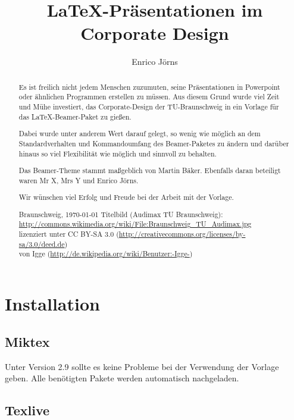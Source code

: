 \documentclass[cmyk,a4paper,colorscheme=green,TUBStitlepage=picture]{tubsreprt}
\author{Enrico Jörns}
\title{LaTeX-Präsentationen im Corporate Design}
\institute{TU-Braunschweig}
\begin{document}
\maketitle

\begin{abstract}
Es ist freilich nicht jedem Menschen zuzumuten, seine Präsentationen in
Powerpoint oder ähnlichen Programmen erstellen zu müssen.
Aus diesem Grund wurde viel Zeit und Mühe investiert, das Corporate-Design der
TU-Braunschweig in ein Vorlage für das \LaTeX-Beamer-Paket zu gießen.\medskip

Dabei wurde unter anderem Wert darauf gelegt, so wenig wie möglich an dem
Standardverhalten und Kommandoumfang des Beamer-Paketes zu ändern und darüber
hinaus so viel Flexibilität wie möglich und sinnvoll zu behalten.\medskip

Das Beamer-Theme stammt maßgeblich von Martin Bäker. Ebenfalls daran beteiligt
waren Mr X, Mrs Y und Enrico Jörns.%
\bigskip

Wir wünschen viel Erfolg und Freude bei der Arbeit mit der Vorlage.
\bigskip

{\hfill Braunschweig, \today}
\vfill
\footnotesize{Titelbild (Audimax TU Braunschweig):\\
\url{http://commons.wikimedia.org/wiki/File:Braunschweig_TU_Audimax.jpg}\\
lizenziert unter CC BY-SA 3.0 (\url{http://creativecommons.org/licenses/by-sa/3.0/deed.de})\\
von Igge (\url{http://de.wikipedia.org/wiki/Benutzer:-Igge-})}
\end{abstract}

\clearpage
\tableofcontents

\chapter{Installation}

\section{Miktex}

Unter Version 2.9 sollte es keine Probleme bei der Verwendung der Vorlage geben.
Alle benötigten Pakete werden automatisch nachgeladen.

\section{Texlive}
\end{document}
